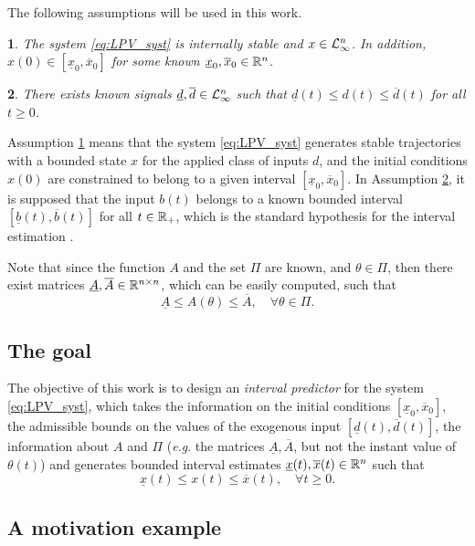 \documentclass[twocolumn,english]{IEEEtran}
\theoremstyle{plain}
\theoremstyle{definition}
\theoremstyle{plain}
\newtheorem{assumption}{\protect\assumptionname}
\theoremstyle{plain}
\theoremstyle{remark}
\providecommand{\assumptionname}{Assumption}
\begin{document}
The following assumptions will be used in this work.
\begin{assumption}
\label{ass:a1} The system \eqref{eq:LPV_syst} is internally stable and $x\in\mathcal{L}_{\infty}^{n}$. In addition, $x(0)\in[\underline{x}_{0},\overline{x}_{0}]$ for some known $\underline{x}_{0},\overline{x}_{0}\in\mathbb{R}^{n}$.
\end{assumption}

\begin{assumption}
\label{ass:a2} There exists known signals $\underline{d},\overline{d}\in\mathcal{L}_{\infty}^{n}$ such that $\underline{d}(t)\leq d(t)\leq\overline{d}(t)$ for all $t\geq0$.
\end{assumption}
Assumption \ref{ass:a1} means that the system \eqref{eq:LPV_syst} generates stable trajectories with a bounded state $x$ for the applied class of inputs $d$, and the initial conditions $x(0)$ are constrained to belong to a given interval $[\underline{x}_{0},\overline{x}_{0}]$. In Assumption \ref{ass:a2}, it is supposed that the input $b(t)$ belongs to a known bounded interval $[\underline{b}(t),\overline{b}(t)]$ for all $t\in\mathbb{R}_{+}$, which is the standard hypothesis for the interval estimation \cite{Efimov2016,Raiessi2018}.

Note that since the function $A$ and the set $\Pi$ are known, and $\theta\in\Pi$, then there exist matrices $\underline{A},\overline{A}\in\mathbb{R}^{n\times n}$, which can be easily computed, such that 
\[
\underline{A}\leq A(\theta)\leq\overline{A},\quad\forall\theta\in\Pi.
\]

\subsection{The goal}

The objective of this work is to design an \emph{interval predictor} for the system \eqref{eq:LPV_syst}, which takes the information on the initial conditions $[\underline{x}_{0},\overline{x}_{0}]$, the admissible bounds on the values of the exogenous input $[\underline{d}(t),\overline{d}(t)]$, the information about $A$ and $\Pi$ (\emph{e.g}. the matrices $\underline{A},\overline{A}$, but not the instant value of $\theta(t)$) and generates bounded interval estimates $\underline{x}(t),\overline{x}(t)\in\mathbb{R}^{n}$ such that
\begin{equation}
\underline{x}(t)\leq x(t)\leq\overline{x}(t),\quad\forall t\geq0.\label{eq:Interval_Goal}
\end{equation}

\subsection{A motivation example}
\end{document}
